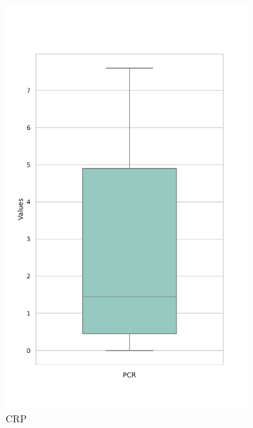 \documentclass[jou]{apa7}
\newcommand{\subfigwidth}{0.2\textwidth}
\begin{document}
\begin{figure}[H]
	\centering
	\begin{subfigure}[b]{\subfigwidth}
		\centering
		\includegraphics[width=\linewidth]{Box_Plot_of_PCR.pdf}
		\caption{CRP}
		\label{fig:BoxPlotPCR}
	\end{subfigure}
	\hspace{0.5em}
	\begin{subfigure}[b]{\subfigwidth}
		\centering

\end{subfigure}
\end{figure}
\end{document}
